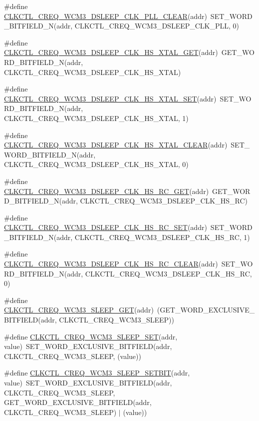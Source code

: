 \begin{DoxyCompactItemize}
\item 
\#define \hyperlink{a00544_a6fc1a5427c7f1a49d94528d94d86ea40}{CLKCTL\_\-CREQ\_\-WCM3\_\-DSLEEP\_\-CLK\_\-PLL\_\-CLEAR}(addr)~SET\_\-WORD\_\-BITFIELD\_\-N(addr, CLKCTL\_\-CREQ\_\-WCM3\_\-DSLEEP\_\-CLK\_\-PLL, 0)
\item 
\#define \hyperlink{a00544_ab5d5652a9a7e403271981148abf3ca8a}{CLKCTL\_\-CREQ\_\-WCM3\_\-DSLEEP\_\-CLK\_\-HS\_\-XTAL\_\-GET}(addr)~GET\_\-WORD\_\-BITFIELD\_\-N(addr, CLKCTL\_\-CREQ\_\-WCM3\_\-DSLEEP\_\-CLK\_\-HS\_\-XTAL)
\item 
\#define \hyperlink{a00544_a78493ad9ad9a9266de3af82d5299fb89}{CLKCTL\_\-CREQ\_\-WCM3\_\-DSLEEP\_\-CLK\_\-HS\_\-XTAL\_\-SET}(addr)~SET\_\-WORD\_\-BITFIELD\_\-N(addr, CLKCTL\_\-CREQ\_\-WCM3\_\-DSLEEP\_\-CLK\_\-HS\_\-XTAL, 1)
\item 
\#define \hyperlink{a00544_a3ea285062315722dafaae49dc2cdeb72}{CLKCTL\_\-CREQ\_\-WCM3\_\-DSLEEP\_\-CLK\_\-HS\_\-XTAL\_\-CLEAR}(addr)~SET\_\-WORD\_\-BITFIELD\_\-N(addr, CLKCTL\_\-CREQ\_\-WCM3\_\-DSLEEP\_\-CLK\_\-HS\_\-XTAL, 0)
\item 
\#define \hyperlink{a00544_ac35db77ca48e56ab0d4c6e667b7fe380}{CLKCTL\_\-CREQ\_\-WCM3\_\-DSLEEP\_\-CLK\_\-HS\_\-RC\_\-GET}(addr)~GET\_\-WORD\_\-BITFIELD\_\-N(addr, CLKCTL\_\-CREQ\_\-WCM3\_\-DSLEEP\_\-CLK\_\-HS\_\-RC)
\item 
\#define \hyperlink{a00544_a9dc981e35a80059f0713e5c0daf12537}{CLKCTL\_\-CREQ\_\-WCM3\_\-DSLEEP\_\-CLK\_\-HS\_\-RC\_\-SET}(addr)~SET\_\-WORD\_\-BITFIELD\_\-N(addr, CLKCTL\_\-CREQ\_\-WCM3\_\-DSLEEP\_\-CLK\_\-HS\_\-RC, 1)
\item 
\#define \hyperlink{a00544_a90249d9269103bb2d929c1a5abeedff0}{CLKCTL\_\-CREQ\_\-WCM3\_\-DSLEEP\_\-CLK\_\-HS\_\-RC\_\-CLEAR}(addr)~SET\_\-WORD\_\-BITFIELD\_\-N(addr, CLKCTL\_\-CREQ\_\-WCM3\_\-DSLEEP\_\-CLK\_\-HS\_\-RC, 0)
\item 
\#define \hyperlink{a00544_a698a05ab90f4d2da804bad303101015b}{CLKCTL\_\-CREQ\_\-WCM3\_\-SLEEP\_\-GET}(addr)~(GET\_\-WORD\_\-EXCLUSIVE\_\-BITFIELD(addr, CLKCTL\_\-CREQ\_\-WCM3\_\-SLEEP))
\item 
\#define \hyperlink{a00544_ac9030eefe0d2ceb435afceb8c40a9dc8}{CLKCTL\_\-CREQ\_\-WCM3\_\-SLEEP\_\-SET}(addr, value)~SET\_\-WORD\_\-EXCLUSIVE\_\-BITFIELD(addr, CLKCTL\_\-CREQ\_\-WCM3\_\-SLEEP, (value))
\item 
\#define \hyperlink{a00544_afadee57ab3b10381a57ffbc858fc918d}{CLKCTL\_\-CREQ\_\-WCM3\_\-SLEEP\_\-SETBIT}(addr, value)~SET\_\-WORD\_\-EXCLUSIVE\_\-BITFIELD(addr, CLKCTL\_\-CREQ\_\-WCM3\_\-SLEEP, GET\_\-WORD\_\-EXCLUSIVE\_\-BITFIELD(addr, CLKCTL\_\-CREQ\_\-WCM3\_\-SLEEP) $|$ (value))

\end{DoxyCompactItemize}
